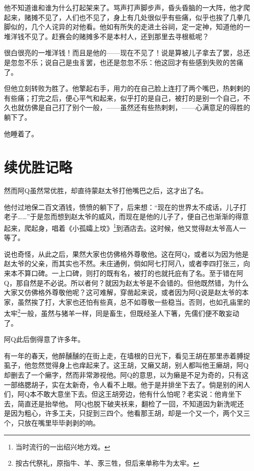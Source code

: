 \documentclass[12pt,UTF8]{ctexbook}
\begin{document}
他不知道谁和谁为什么打起架来了。骂声打声脚步声，昏头昏脑的一大阵，他才爬起来，赌摊不见了，人们也不见了，身上有几处很似乎有些痛，似乎也挨了几拳几脚似的，几个人诧异的对他看。他如有所失的走进土谷祠，定一定神，知道他的一堆洋钱不见了。赶赛会的赌摊多不是本村人，还到那里去寻根柢呢？

很白很亮的一堆洋钱！而且是他的——现在不见了！说是算被儿子拿去了罢，总还是忽忽不乐；说自己是虫豸罢，也还是忽忽不乐：他这回才有些感到失败的苦痛了。

但他立刻转败为胜了。他擎起右手，用力的在自己脸上连打了两个嘴巴，热剌剌的有些痛；打完之后，便心平气和起来，似乎打的是自己，被打的是别一个自己，不久也就仿佛是自己打了别个一般，——虽然还有些热剌剌，——心满意足的得胜的躺下了。

他睡着了。

\chapter{续优胜记略}

然而阿Q虽然常优胜，却直待蒙赵太爷打他嘴巴之后，这才出了名。

他付过地保二百文酒钱，愤愤的躺下了，后来想：“现在的世界太不成话，儿子打老子……”于是忽而想到赵太爷的威风，而现在是他的儿子了，便自己也渐渐的得意起来，爬起身，唱着《小孤孀上坟》\footnote{当时流行的一出绍兴地方戏。}到酒店去。这时候，他又觉得赵太爷高人一等了。

说也奇怪，从此之后，果然大家也仿佛格外尊敬他。这在阿Q，或者以为因为他是赵太爷的父亲，而其实也不然。未庄通例，倘如阿七打阿八，或者李四打张三，向来本不算口碑。一上口碑，则打的既有名，被打的也就托庇有了名。至于错在阿Q，那自然是不必说。所以者何？就因为赵太爷是不会错的。但他既然错，为什么大家又仿佛格外尊敬他呢？这可难解，穿凿起来说，或者因为阿Q说是赵太爷的本家，虽然挨了打，大家也还怕有些真，总不如尊敬一些稳当。否则，也如孔庙里的太牢\footnote{按古代祭礼，原指牛、羊、豕三牲，但后来单称牛为太牢。}一般，虽然与猪羊一样，同是畜生，但既经圣人下箸，先儒们便不敢妄动了。

阿Q此后倒得意了许多年。

有一年的春天，他醉醺醺的在街上走，在墙根的日光下，看见王胡在那里赤着膊捉虱子，他忽然觉得身上也痒起来了。这王胡，又癞又胡，别人都叫他王癞胡，阿Q却删去了一个癞字，然而非常渺视他。阿Q的意思，以为癞是不足为奇的，只有这一部络腮胡子，实在太新奇，令人看不上眼。他于是并排坐下去了。倘是别的闲人们，阿Q本不敢大意坐下去。但这王胡旁边，他有什么怕呢？老实说：他肯坐下去，简直还是抬举他。
阿Q也脱下破夹袄来，翻检了一回，不知道因为新洗呢还是因为粗心，许多工夫，只捉到三四个。他看那王胡，却是一个又一个，两个又三个，只放在嘴里毕毕剥剥的响。
\end{document}
